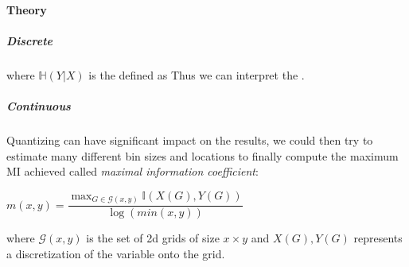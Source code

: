 \paragraph{Theory}
\subparagraph{Discrete}
\begin{center}
\end{center}
where $\mathbb{H}(Y|X)$ is the  defined as 
Thus we can interpret the .

\subparagraph{Continuous}
Quantizing can have significant impact on the results, we could then try to estimate
many different bin sizes and locations to finally compute the maximum MI achieved 
called \emph{maximal information coefficient}:
\begin{center}
    $m(x,y) = \dfrac{\max_{G\in\mathcal{G}(x,y)}\mathbb{I}\left(X(G),Y(G)\right)}{
    \log\left(min(x,y)\right)}$
\end{center}
where $\mathcal{G}(x,y)$ is the set of 2d grids of size $x\times y$ and $X(G), Y(G)$
represents a discretization of the variable onto the grid.


